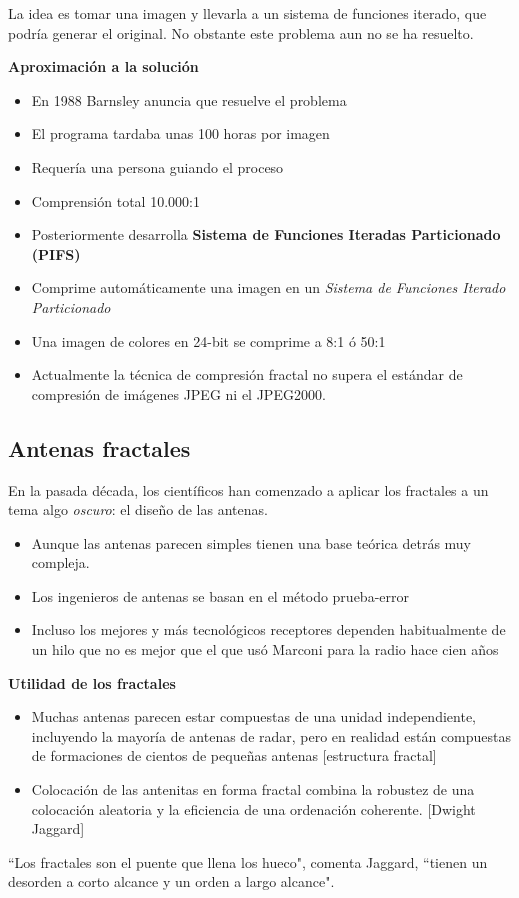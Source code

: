 \documentclass[8pt]{beamer}
\begin{document}
\begin{frame}
La idea es tomar una imagen y llevarla a un sistema de funciones iterado, que podría generar el original. No obstante este problema aun no se ha resuelto.

\textbf{Aproximación a la solución}
\begin{itemize}[<+(1)->]
\item En 1988 Barnsley anuncia que resuelve el problema
\item El programa tardaba unas 100 horas por imagen
\item Requería una persona guiando el proceso
\item Comprensión total 10.000:1
\item Posteriormente desarrolla \textbf{Sistema de Funciones Iteradas Particionado (PIFS)}
\item Comprime automáticamente una imagen en un \emph{Sistema de Funciones Iterado Particionado}
\item Una imagen de colores en 24-bit se comprime a 8:1 ó 50:1
\item Actualmente la técnica de compresión fractal no supera el estándar de compresión de imágenes JPEG ni el JPEG2000.
\end{itemize}
\end{frame}

\subsection{Antenas fractales}

\begin{frame}
En la pasada década, los científicos han comenzado a aplicar los fractales a un tema algo \emph{oscuro}: el diseño de las antenas.

\begin{itemize}
\item Aunque las antenas parecen simples tienen una base teórica detrás muy compleja.
\item Los ingenieros de antenas se basan en el método prueba-error
\item Incluso los mejores y más tecnológicos receptores dependen habitualmente de un hilo que no es mejor que el que usó Marconi para la radio hace cien años
\end{itemize}

\textbf{Utilidad de los fractales}
\begin{itemize}
\item Muchas antenas parecen estar compuestas de una unidad independiente, incluyendo la mayoría de antenas de radar, pero en realidad están compuestas de formaciones de cientos de pequeñas antenas [estructura fractal]
\item Colocación de las antenitas en forma fractal combina la robustez de una colocación aleatoria y la eficiencia de una ordenación coherente. [Dwight Jaggard]
\end{itemize}

\begin{center}
``Los fractales son el puente que llena los hueco", comenta Jaggard, ``tienen un desorden a corto alcance y un orden a largo alcance".
\end{center}
\end{frame}
\end{document}
